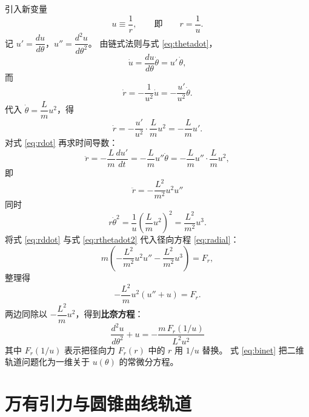 \documentclass[UTF8,a4paper,11pt]{ctexart}
\begin{document}
引入新变量
\begin{equation}
  u \equiv \frac{1}{r}, \qquad\text{即}\qquad r=\frac{1}{u}.
\end{equation}
记 \(u'=\dfrac{du}{d\theta}\)，\(u''=\dfrac{d^{2}u}{d\theta^{2}}\)。
由链式法则与式 \eqref{eq:thetadot}，
\begin{equation}
  \dot u = \frac{du}{d\theta}\dot\theta = u'\,\dot\theta ,
\end{equation}
而
\begin{equation}
  \dot r = -\frac{1}{u^{2}}\dot u
  = -\frac{u'}{u^{2}}\dot\theta .
\end{equation}
代入 \(\dot\theta = \dfrac{L}{m}u^{2}\)，得
\begin{equation}
  \dot r = -\frac{u'}{u^{2}}\cdot\frac{L}{m}u^{2}
  = -\frac{L}{m}u' . \label{eq:rdot}
\end{equation}
对式 \eqref{eq:rdot} 再求时间导数：
\begin{equation}
  \ddot r = -\frac{L}{m}\frac{d u'}{dt}
  = -\frac{L}{m}u''\dot\theta
  = -\frac{L}{m}u''\cdot\frac{L}{m}u^{2},
\end{equation}
即
\begin{equation}
  \boxed{\ \ddot r = -\frac{L^{2}}{m^{2}}u^{2}u''\ } \label{eq:rddot}
\end{equation}
同时
\begin{equation}
  r\dot\theta^{2}
  = \frac{1}{u}\left(\frac{L}{m}u^{2}\right)^{2}
  = \frac{L^{2}}{m^{2}}u^{3} . \label{eq:rthetadot2}
\end{equation}
将式 \eqref{eq:rddot} 与式 \eqref{eq:rthetadot2} 代入径向方程 \eqref{eq:radial}：
\begin{equation}
  m\left(-\frac{L^{2}}{m^{2}}u^{2}u''
  - \frac{L^{2}}{m^{2}}u^{3}\right)=F_r ,
\end{equation}
整理得
\begin{equation}
  -\frac{L^{2}}{m}u^{2}\left(u''+u\right)=F_r .
\end{equation}
两边同除以 \(-\dfrac{L^{2}}{m}u^{2}\)，得到\textbf{比奈方程}：
\begin{equation}
  \boxed{\
  \frac{d^{2}u}{d\theta^{2}} + u
  = -\frac{m\,F_r(1/u)}{L^{2}u^{2}}
  \ } \label{eq:binet}
\end{equation}
其中 \(F_r(1/u)\) 表示把径向力 \(F_r(r)\) 中的 \(r\) 用 \(1/u\) 替换。
式 \eqref{eq:binet} 把二维轨道问题化为一维关于 \(u(\theta)\) 的常微分方程。

\section{万有引力与圆锥曲线轨道}
\end{document}
